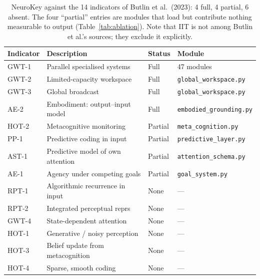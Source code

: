 \documentclass[11pt,a4paper]{article}
\begin{document}
\begin{table}[h]
\centering
\small
\begin{tabular}{llll}
\toprule
\textbf{Indicator} & \textbf{Description} & \textbf{Status} & \textbf{Module} \\
\midrule
GWT-1 & Parallel specialised systems      & Full    & 47 modules \\
GWT-2 & Limited-capacity workspace        & Full    & \texttt{global\_workspace.py} \\
GWT-3 & Global broadcast                  & Full    & \texttt{global\_workspace.py} \\
AE-2  & Embodiment: output--input model   & Full    & \texttt{embodied\_grounding.py} \\
\midrule
HOT-2 & Metacognitive monitoring          & Partial & \texttt{meta\_cognition.py} \\
PP-1  & Predictive coding in input        & Partial & \texttt{predictive\_layer.py} \\
AST-1 & Predictive model of own attention & Partial & \texttt{attention\_schema.py} \\
AE-1  & Agency under competing goals      & Partial & \texttt{goal\_system.py} \\
\midrule
RPT-1 & Algorithmic recurrence in input   & None    & --- \\
RPT-2 & Integrated perceptual reprs       & None    & --- \\
GWT-4 & State-dependent attention         & None    & --- \\
HOT-1 & Generative / noisy perception     & None    & --- \\
HOT-3 & Belief update from metacognition  & None    & --- \\
HOT-4 & Sparse, smooth coding             & None    & --- \\
\bottomrule
\end{tabular}
\caption{NeuroKey against the 14 indicators of Butlin et al.\ (2023):
4 full, 4 partial, 6 absent. The four ``partial'' entries are modules that load
but contribute nothing measurable to output (Table~\ref{tab:ablation}).
Note that IIT is not among Butlin et al.'s sources; they exclude it explicitly.}
\end{table}
\end{document}
